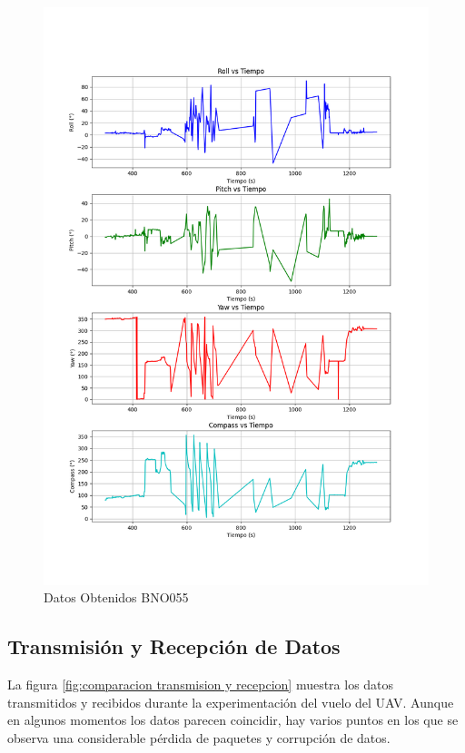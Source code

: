\begin{figure}[H]
    \centering
    \includegraphics[width=15 cm]{Imagenes/Vuelo/BNO055_orientacion.png}
    \caption{Datos Obtenidos BNO055}
    \label{fig:datos obtenidos BNO055}
\end{figure}


\subsection{Transmisión y Recepción de Datos}

La figura \ref{fig:comparacion transmision y recepcion} muestra los datos transmitidos y recibidos durante la experimentación del vuelo del UAV. Aunque en algunos momentos los datos parecen coincidir, hay varios puntos en los que se observa una considerable pérdida de paquetes y corrupción de datos.\\

